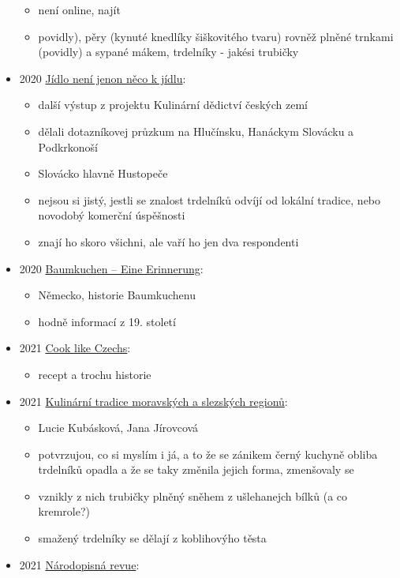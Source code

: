 \begin{itemize}
  \begin{itemize}
  \tightlist
  \item
    není online, najít
  \item
    povidly), pěry (kynuté knedlíky šiškovitého tvaru) rovněž plněné
    trnkami (povidly) a sypané mákem, trdelníky - jakési trubičky
  \end{itemize}
\item
  2020
  \href{https://kulturni-dejiny.slu.cz/data/uploads/067/upvysledky/jidlo-neni-jenom_odborna-kniha_uplatnny_2020.pdf}{Jídlo
  není jenon něco k jídlu}:

  \begin{itemize}
  \tightlist
  \item
    další výstup z projektu Kulinární dědictví českých zemí
  \item
    dělali dotazníkovej průzkum na Hlučínsku, Hanáckym Slovácku a
    Podkrkonoší
  \item
    Slovácko hlavně Hustopeče
  \item
    nejsou si jistý, jestli se znalost trdelníků odvíjí od lokální
    tradice, nebo novodobý komerční úspěšnosti
  \item
    znají ho skoro všichni, ale vaří ho jen dva respondenti
  \end{itemize}
\item
  2020
  \href{https://uwe-spiekermann.com/2020/12/01/baumkuchen-eine-erinnerung/}{Baumkuchen
  -- Eine Erinnerung}:

  \begin{itemize}
  \tightlist
  \item
    Německo, historie Baumkuchenu
  \item
    hodně informací z 19. století
  \end{itemize}
\item
  2021 \href{https://www.cooklikeczechs.com/trdelnik/}{Cook like
  Czechs}:

  \begin{itemize}
  \tightlist
  \item
    recept a trochu historie
  \end{itemize}
\item
  2021
  \href{https://www.nzm.cz/o-nas/veda-a-vyzkum/publikacni-cinnost/odborne-publikace/kulinarni-tradice-moravskych-a-slezskych-regionu}{Kulinární
  tradice moravských a slezských regionů}:

  \begin{itemize}
  \tightlist
  \item
    Lucie Kubásková, Jana Jírovcová
  \item
    potvrzujou, co si myslím i já, a to že se zánikem černý kuchyně
    obliba trdelníků opadla a že se taky změnila jejich forma,
    zmenšovaly se
  \item
    vznikly z nich trubičky plněný sněhem z ušlehanejch bílků (a co
    kremrole?)
  \item
    smažený trdelníky se dělají z koblihovýho těsta
  \end{itemize}
\item
  2021
  \href{https://revue.nulk.cz/wp-content/uploads/2022/01/r4-2021-1.pdf\#page=16}{Národopisná
  revue}:


\end{itemize}
